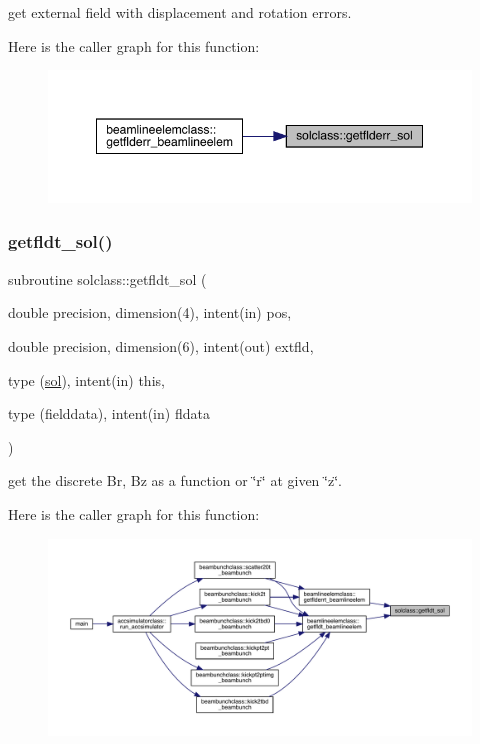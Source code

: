 get external field with displacement and rotation errors. 

Here is the caller graph for this function\+:\nopagebreak
\begin{figure}[H]
\begin{center}
\leavevmode
\includegraphics[width=349pt]{namespacesolclass_a571ab7b6c8ce4dd9e7eaa2489b874682_icgraph}
\end{center}
\end{figure}
\mbox{\label{namespacesolclass_ae8d2c14b13bdf023c1a9efb101b4c666}} 
\subsubsection{\texorpdfstring{getfldt\_sol()}{getfldt\_sol()}}
{\footnotesize\ttfamily subroutine solclass\+::getfldt\+\_\+sol (\begin{DoxyParamCaption}\item[{double precision, dimension(4), intent(in)}]{pos,  }\item[{double precision, dimension(6), intent(out)}]{extfld,  }\item[{type (\mbox{\hyperlink{namespacesolclass_structsolclass_1_1sol}{sol}}), intent(in)}]{this,  }\item[{type (fielddata), intent(in)}]{fldata }\end{DoxyParamCaption})}



get the discrete Br, Bz as a function or \char`\"{}r\char`\"{} at given \char`\"{}z\char`\"{}. 

Here is the caller graph for this function\+:\nopagebreak
\begin{figure}[H]
\begin{center}
\leavevmode
\includegraphics[width=350pt]{namespacesolclass_ae8d2c14b13bdf023c1a9efb101b4c666_icgraph}
\end{center}
\end{figure}
\mbox{\label{namespacesolclass_a68e03415e9802b36da3ec9bae72f41b7}} 
